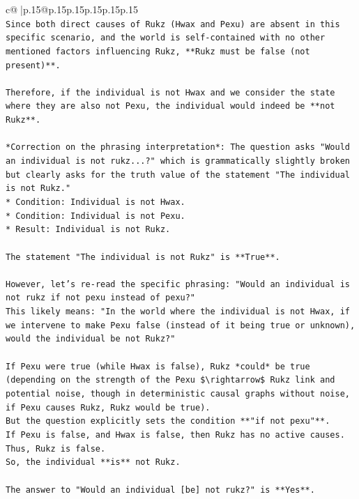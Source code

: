 \documentclass{article}
\begin{document}
{\begin{supertabular}{c@{$\;$}|p{.15\linewidth}@{}p{.15\linewidth}p{.15\linewidth}p{.15\linewidth}p{.15\linewidth}p{.15\linewidth}}
{{{\\ 
\texttt{Since both direct causes of Rukz (Hwax and Pexu) are absent in this specific scenario, and the world is self{-}contained with no other mentioned factors influencing Rukz, **Rukz must be false (not present)**.} \\
\\ 
\texttt{Therefore, if the individual is not Hwax and we consider the state where they are also not Pexu, the individual would indeed be **not Rukz**.} \\
\\ 
\texttt{*Correction on the phrasing interpretation*: The question asks "Would an individual is not rukz...?" which is grammatically slightly broken but clearly asks for the truth value of the statement "The individual is not Rukz."} \\
\texttt{*   Condition: Individual is not Hwax.} \\
\texttt{*   Condition: Individual is not Pexu.} \\
\texttt{*   Result: Individual is not Rukz.} \\
\\ 
\texttt{The statement "The individual is not Rukz" is **True**.} \\
\\ 
\texttt{However, let's re{-}read the specific phrasing: "Would an individual is not rukz if not pexu instead of pexu?"} \\
\texttt{This likely means: "In the world where the individual is not Hwax, if we intervene to make Pexu false (instead of it being true or unknown), would the individual be not Rukz?"} \\
\\ 
\texttt{If Pexu were true (while Hwax is false), Rukz *could* be true (depending on the strength of the Pexu \$\textbackslash{}rightarrow\$ Rukz link and potential noise, though in deterministic causal graphs without noise, if Pexu causes Rukz, Rukz would be true).} \\
\texttt{But the question explicitly sets the condition **"if not pexu"**.} \\
\texttt{If Pexu is false, and Hwax is false, then Rukz has no active causes. Thus, Rukz is false.} \\
\texttt{So, the individual **is** not Rukz.} \\
\\ 
\texttt{The answer to "Would an individual {[}be{]} not rukz?" is **Yes**.} \\
\\ 
}}}
\end{supertabular}}
\end{document}
